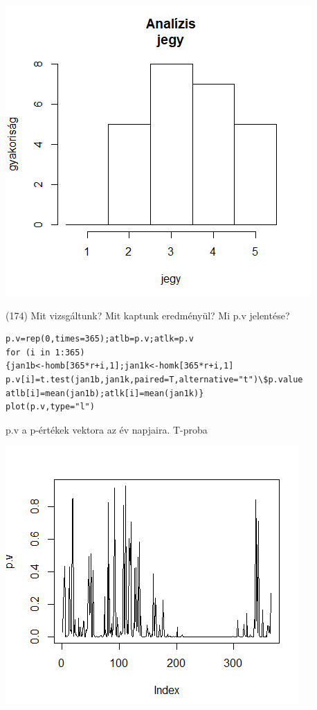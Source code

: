 \documentclass[12p]{article}
\begin{document}
\includegraphics{histogram}

(174)  Mit vizsgáltunk? Mit kaptunk eredményül? Mi p.v jelentése?

\begin{verbatim}
p.v=rep(0,times=365);atlb=p.v;atlk=p.v
for (i in 1:365)
{jan1b<-homb[365*r+i,1];jan1k<-homk[365*r+i,1]
p.v[i]=t.test(jan1b,jan1k,paired=T,alternative="t")\$p.value
atlb[i]=mean(jan1b);atlk[i]=mean(jan1k)}
plot(p.v,type="l")
\end{verbatim}

p.v a p-értékek vektora az év napjaira. T-proba

\includegraphics{pv}
\end{document}
